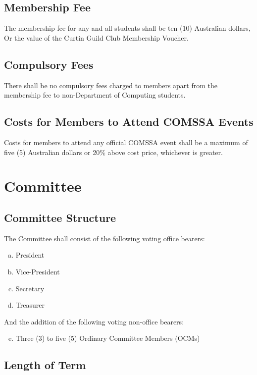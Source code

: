 \documentclass[a4paper,12pt]{article}
\begin{document}
\subsection{Membership Fee}

The membership fee for any and all students shall be ten (10) Australian dollars, Or the value of the Curtin Guild Club Membership Voucher.

\subsection{Compulsory Fees}

There shall be no compulsory fees charged to members apart from the membership fee to non-Department of Computing students.

\subsection{Costs for Members to Attend COMSSA Events}

Costs for members to attend any official COMSSA event shall be a maximum of five (5) Australian dollars or 20\% above cost price, whichever is greater.

\section{Committee}

\subsection{Committee Structure}

The Committee shall consist of the following voting office bearers:

\begin{enumerate}[a)]
	\item President
	\item Vice-President
	\item Secretary
	\item Treasurer
\end{enumerate}

And the addition of the following voting non-office bearers:

\begin{enumerate}[a)]
	\setcounter{enumi}{4}
	\item Three (3) to five (5) Ordinary Committee Members (OCMs)
\end{enumerate}

\subsection{Length of Term}
\end{document}
